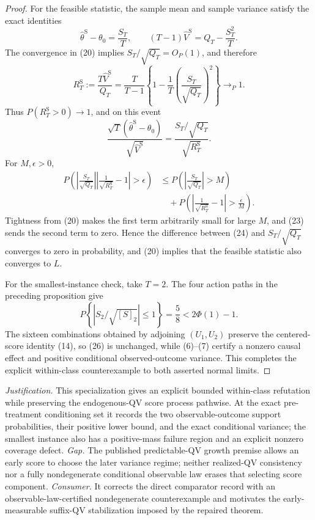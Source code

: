 \documentclass{article}
\begin{document}
\begin{proof}
For the feasible statistic, the sample mean and sample variance satisfy the exact identities
\[
\widehat\theta^{\mathrm S}-\theta_0=\frac{S_T}{T},
\qquad
(T-1)\widehat V^{\mathrm S}=Q_T-\frac{S_T^2}{T}.
\tag{22}
\]
The convergence in (20) implies \(S_T/\sqrt{Q_T}=O_P(1)\), and therefore
\[
R_T^{\mathrm S}:=\frac{T\widehat V^{\mathrm S}}{Q_T}
=\frac{T}{T-1}
\left\{1-\frac1T\left(\frac{S_T}{\sqrt{Q_T}}\right)^2\right\}
\to_P1.
\tag{23}
\]
Thus \(P(R_T^{\mathrm S}>0)\to1\), and on this event
\[
\frac{\sqrt T(\widehat\theta^{\mathrm S}-\theta_0)}{\sqrt{\widehat V^{\mathrm S}}}
=\frac{S_T/\sqrt{Q_T}}{\sqrt{R_T^{\mathrm S}}}.
\tag{24}
\]
For \(M,\epsilon>0\),
\[
\begin{aligned}
P\!\left(
\left|\frac{S_T}{\sqrt{Q_T}}\right|
\left|\frac1{\sqrt{R_T^{\mathrm S}}}-1\right|>\epsilon
\right)
&\le P\!\left(\left|\frac{S_T}{\sqrt{Q_T}}\right|>M\right)\\
&\quad+P\!\left(\left|\frac1{\sqrt{R_T^{\mathrm S}}}-1\right|>\frac\epsilon M\right).
\end{aligned}
\tag{25}
\]
Tightness from (20) makes the first term arbitrarily small for large \(M\), and (23) sends the second term to zero.  Hence the difference between (24) and \(S_T/\sqrt{Q_T}\) converges to zero in probability, and (20) implies that the feasible statistic also converges to \(L\).

For the smallest-instance check, take \(T=2\).  The four action paths in the preceding proposition give
\[
P\!\left\{\left|S_2/\sqrt{[S]_2}\right|\le1\right\}=\frac58<2\Phi(1)-1.
\tag{26}
\]
The sixteen combinations obtained by adjoining \((U_1,U_2)\) preserve the centered-score identity (14), so (26) is unchanged, while (6)--(7) certify a nonzero causal effect and positive conditional observed-outcome variance.  This completes the explicit within-class counterexample to both asserted normal limits.
\end{proof}
\par\smallskip\noindent \textit{Justification.} This specialization gives an explicit bounded within-class refutation while preserving the endogenous-QV score process pathwise. At the exact pre-treatment conditioning set it records the two observable-outcome support probabilities, their positive lower bound, and the exact conditional variance; the smallest instance also has a positive-mass failure region and an explicit nonzero coverage defect. \textit{Gap.} The published predictable-QV growth premise allows an early score to choose the later variance regime; neither realized-QV consistency nor a fully nondegenerate conditional observable law erases that selecting score component. \textit{Consumer.} It corrects the direct comparator record with an observable-law-certified nondegenerate counterexample and motivates the early-measurable suffix-QV stabilization imposed by the repaired theorem.
\end{document}
